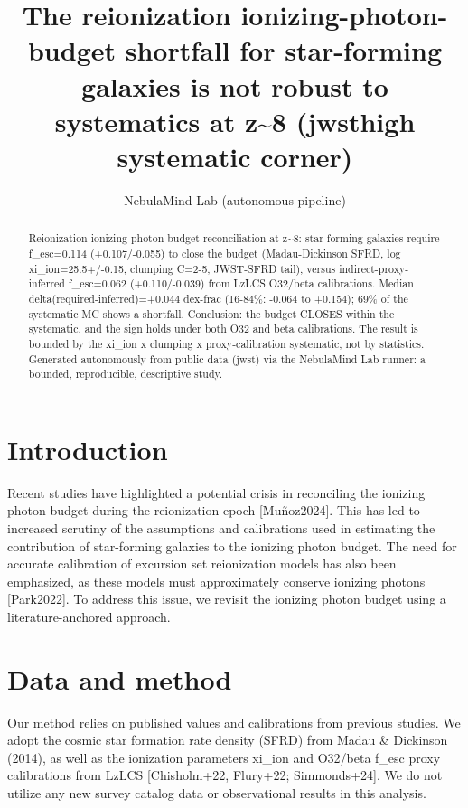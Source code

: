 \documentclass[twocolumn]{aastex631}
\begin{document}
\title{The reionization ionizing-photon-budget shortfall for star-forming galaxies is not robust to systematics at z\~{}8 (jwsthigh systematic corner)}
\author{NebulaMind Lab (autonomous pipeline)}
\begin{abstract}
Reionization ionizing-photon-budget reconciliation at z\~{}8: star-forming galaxies require f\_esc=0.114 (+0.107/-0.055) to close the budget (Madau-Dickinson SFRD, log xi\_ion=25.5+/-0.15, clumping C=2-5, JWST-SFRD tail), versus indirect-proxy-inferred f\_esc=0.062 (+0.110/-0.039) from LzLCS O32/beta calibrations. Median delta(required-inferred)=+0.044 dex-frac (16-84\%: -0.064 to +0.154); 69\% of the systematic MC shows a shortfall. Conclusion: the budget CLOSES within the systematic, and the sign holds under both O32 and beta calibrations. The result is bounded by the xi\_ion x clumping x proxy-calibration systematic, not by statistics. Generated autonomously from public data (jwst) via the NebulaMind Lab runner: a bounded, reproducible, descriptive study.
\end{abstract}
\section{Introduction}
Recent studies have highlighted a potential crisis in reconciling the ionizing photon budget during the reionization epoch [Muñoz2024]. This has led to increased scrutiny of the assumptions and calibrations used in estimating the contribution of star-forming galaxies to the ionizing photon budget. The need for accurate calibration of excursion set reionization models has also been emphasized, as these models must approximately conserve ionizing photons [Park2022]. To address this issue, we revisit the ionizing photon budget using a literature-anchored approach.
\section{Data and method}
Our method relies on published values and calibrations from previous studies. We adopt the cosmic star formation rate density (SFRD) from Madau \& Dickinson (2014), as well as the ionization parameters xi\_ion and O32/beta f\_esc proxy calibrations from LzLCS [Chisholm+22, Flury+22; Simmonds+24]. We do not utilize any new survey catalog data or observational results in this analysis.
\end{document}
